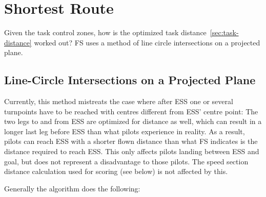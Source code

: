 \documentclass{article}
\begin{document}
\newpage
\appendix
\section{Shortest Route}
\label{sec:shortest-route}
Given the task control zones, how is the optimized task
distance~\ref{sec:task-distance} worked out? FS uses a method of line circle
intersections on a projected plane.

\subsection{Line-Circle Intersections on a Projected Plane}
Currently, this method mistreats the case where after ESS one or several
turnpoints have to be reached with centres different from ESS’ centre point:
The two legs to and from ESS are optimized for distance as well, which can
result in a longer last leg before ESS than what pilots experience in reality.
As a result, pilots can reach ESS with a shorter flown distance than what FS
indicates is the distance required to reach ESS. This only affects pilots
landing between ESS and goal, but does not represent a disadvantage to those
pilots. The speed section distance calculation used for scoring (see below) is
not affected by this.

Generally the algorithm does the following:
\end{document}
